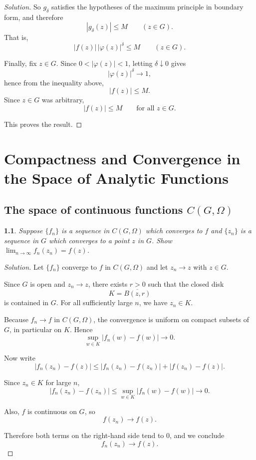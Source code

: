 \documentclass[12pt, a4paper]{report}
\theoremstyle{spaced}
\newtheorem{exercise}{}
\newcommand{\setexercise}[1]{\setcounter{exercise}{#1-1}}
\begin{document}
\begin{proof}[Solution]
	So \(g_\delta\) satisfies the hypotheses of the maximum principle in boundary form, and therefore
	\[
		|g_\delta(z)|\le M \qquad (z\in G).
	\]
	That is,
	\[
		|f(z)|\,|\varphi(z)|^\delta \le M
		\qquad (z\in G).
	\]

	Finally, fix \(z\in G\). Since \(0<|\varphi(z)|<1\), letting \(\delta\downarrow 0\) gives
	\[
		|\varphi(z)|^\delta \to 1,
	\]
	hence from the inequality above,
	\[
		|f(z)|\le M.
	\]
	Since \(z\in G\) was arbitrary,
	\[
		|f(z)|\le M \qquad \text{for all } z\in G.
	\]

	This proves the result.
\end{proof}


\chapter{Compactness and Convergence in the Space of Analytic Functions}
\section{The space of continuous functions $C(G,\Omega)$}

\setexercise{5}
\begin{exercise}
	Suppose $\{f_n\}$ is a sequence in $C(G,\Omega)$ which converges to $f$ and $\{z_n\}$ is a sequence in $G$ which converges to a point $z$ in $G$.
	Show $\lim_{n\to\infty} f_n(z_n)=f(z)$.
\end{exercise}

\begin{proof}[Solution]
	Let $\{f_n\}$ converge to $f$ in $C(G,\Omega)$ and let $z_n \to z$ with $z \in G$.

	Since $G$ is open and $z_n \to z$, there exists $r>0$ such that the closed disk
	\[
		K=\overline{B(z,r)}
	\]
	is contained in $G$. For all sufficiently large $n$, we have $z_n \in K$.

	Because $f_n \to f$ in $C(G,\Omega)$, the convergence is uniform on compact subsets of $G$, in particular on $K$. Hence
	\[
		\sup_{w\in K} |f_n(w)-f(w)| \to 0.
	\]

	Now write
	\[
		|f_n(z_n)-f(z)|
		\le |f_n(z_n)-f(z_n)| + |f(z_n)-f(z)|.
	\]

	Since $z_n \in K$ for large $n$,
	\[
		|f_n(z_n)-f(z_n)| \le \sup_{w\in K}|f_n(w)-f(w)| \to 0.
	\]

	Also, $f$ is continuous on $G$, so
	\[
		f(z_n) \to f(z).
	\]

	Therefore both terms on the right-hand side tend to $0$, and we conclude
	\[
		f_n(z_n) \to f(z).
	\]
\end{proof}
\end{document}
